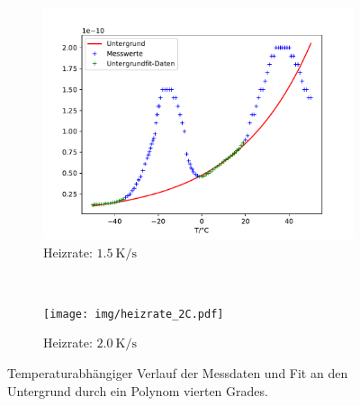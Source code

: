 \begin{figure}[htp]
    \centering
    \begin{subfigure}[t]{0.5\textwidth}
        \centering
        \includegraphics[width=\textwidth]{img/heizrate_15C.pdf}
        \caption{Heizrate: $\SI{1.5}{\kelvin\per\second}$}
    \end{subfigure}%
    ~
    \begin{subfigure}[t]{0.5\textwidth}
        \centering
        \texttt{[image: img/heizrate\_2C.pdf]}
        \caption{Heizrate: $\SI{2.0}{\kelvin\per\second}$}
    \end{subfigure}
    \caption{Temperaturabhängiger Verlauf der Messdaten und Fit an den Untergrund durch ein Polynom vierten Grades.}
    \label{fig:bg}
\end{figure}

